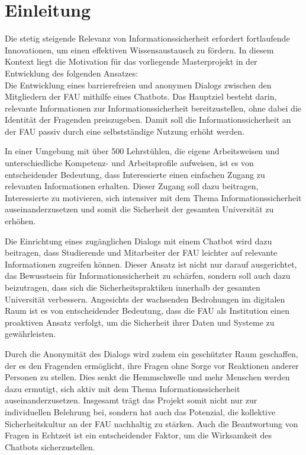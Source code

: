 \documentclass[german,report]{i1thesis}
\begin{document}
\makethetitle%

\maketoc%

\newpage
\section{Einleitung}%
\label{sec:einleitung}

Die stetig steigende Relevanz von Informationssicherheit erfordert fortlaufende Innovationen, um einen effektiven Wissensaustausch zu fördern.
In diesem Kontext liegt die Motivation für das vorliegende Masterprojekt in der Entwicklung des folgenden Ansatzes: \\
Die Entwicklung eines barrierefreien und anonymen Dialogs zwischen den Mitgliedern der \ac{FAU} mithilfe eines Chatbots.
Das Hauptziel besteht darin, relevante Informationen zur Informationssicherheit bereitzustellen, ohne dabei die Identität der Fragenden preiszugeben.
Damit soll die Informationssicherheit an der \ac{FAU} passiv durch eine selbstständige Nutzung erhöht werden.

In einer Umgebung mit über 500 Lehrstühlen, die eigene Arbeitsweisen und unterschiedliche Kompetenz- und Arbeitsprofile aufweisen, ist es von entscheidender Bedeutung,
dass Interessierte einen einfachen Zugang zu relevanten Informationen erhalten.
Dieser Zugang soll dazu beitragen, Interessierte zu motivieren, sich intensiver mit dem Thema Informationssicherheit auseinanderzusetzen und somit die Sicherheit der gesamten Universität zu erhöhen.

Die Einrichtung eines zugänglichen Dialogs mit einem Chatbot wird dazu beitragen, dass Studierende und Mitarbeiter der \ac{FAU} leichter auf relevante Informationen zugreifen können.
Dieser Ansatz ist nicht nur darauf ausgerichtet, das Bewusstsein für Informationssicherheit zu schärfen, sondern soll auch dazu beizutragen, dass sich die Sicherheitspraktiken innerhalb der gesamten Universität verbessern.
Angesichts der wachsenden Bedrohungen im digitalen Raum ist es von entscheidender Bedeutung, dass die \ac{FAU} als Institution einen proaktiven Ansatz verfolgt, um die Sicherheit ihrer Daten und Systeme zu gewährleisten.

Durch die Anonymität des Dialogs wird zudem ein geschützter Raum geschaffen, der es den Fragenden ermöglicht, ihre Fragen ohne Sorge vor Reaktionen anderer Personen zu stellen.
Dies senkt die Hemmschwelle und mehr Menschen werden dazu ermutigt, sich aktiv mit dem Thema Informationssicherheit auseinanderzusetzen.
Insgesamt trägt das Projekt somit nicht nur zur individuellen Belehrung bei, sondern hat auch das Potenzial, die kollektive Sicherheitskultur an der \ac{FAU} nachhaltig zu stärken.
Auch die Beantwortung von Fragen in Echtzeit ist ein entscheidender Faktor, um die Wirksamkeit des Chatbots sicherzustellen.
\end{document}
